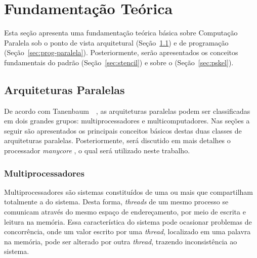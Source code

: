 \chapter{Fundamentação Teórica}
\label{cha:fundTeorica}

Esta seção apresenta uma fundamentação teórica básica sobre Computação Paralela sob
o ponto de vista arquitetural (Seção~\ref{sec:arquiteturas}) e de programação (Seção~\ref{sec:prog-paralela}).
Posteriormente, serão apresentados os conceitos fundamentais do padrão \stencil (Seção~\ref{sec:stencil}) e
sobre o \fw \pskel (Seção~\ref{sec:pskel}).

\section{Arquiteturas Paralelas}
\label{sec:arquiteturas}

De acordo com Tanenbaum~\etal~\cite{Tanenbaum2015}, as arquiteturas paralelas podem ser classificadas em
dois grandes grupos: multiprocessadores e multicomputadores. Nas seções a seguir são apresentados os
principais conceitos básicos destas duas classes de arquiteturas paralelas. Posteriormente, será discutido
em mais detalhes o processador \textit{manycore} \mppa, o qual será utilizado neste trabalho.


\subsection{Multiprocessadores}




Multiprocessadores são sistemas constituídos de uma ou mais \cpus que
compartilham totalmente
a \ram do sistema. Desta forma, \textit{threads} de um mesmo processo se
comunicam através do mesmo espaço de endereçamento, por meio de escrita e
leitura na memória. Essa característica do sistema pode ocasionar problemas de
concorrência, onde um valor escrito por uma \textit{thread}, localizado em uma
palavra na memória, pode ser alterado por outra \textit{thread}, trazendo
inconsistência ao sistema.

